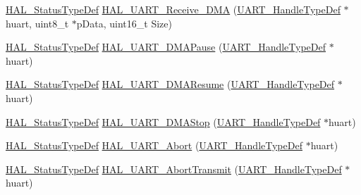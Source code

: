 \begin{DoxyCompactItemize}
\item 
\hyperlink{stm32f4xx__hal__def_8h_a63c0679d1cb8b8c684fbb0632743478f}{H\+A\+L\+\_\+\+Status\+Type\+Def} \hyperlink{group___u_a_r_t___exported___functions___group2_gad674cce054e58927720cd689620ffa08}{H\+A\+L\+\_\+\+U\+A\+R\+T\+\_\+\+Receive\+\_\+\+D\+MA} (\hyperlink{group___u_a_r_t___exported___types_ga7adf4f3e4c3ecde572be5925c915a967}{U\+A\+R\+T\+\_\+\+Handle\+Type\+Def} $\ast$huart, uint8\+\_\+t $\ast$p\+Data, uint16\+\_\+t Size)
\item 
\hyperlink{stm32f4xx__hal__def_8h_a63c0679d1cb8b8c684fbb0632743478f}{H\+A\+L\+\_\+\+Status\+Type\+Def} \hyperlink{group___u_a_r_t___exported___functions___group2_ga8a713fd976d8ef02b818ea6ff0d4e41a}{H\+A\+L\+\_\+\+U\+A\+R\+T\+\_\+\+D\+M\+A\+Pause} (\hyperlink{group___u_a_r_t___exported___types_ga7adf4f3e4c3ecde572be5925c915a967}{U\+A\+R\+T\+\_\+\+Handle\+Type\+Def} $\ast$huart)
\item 
\hyperlink{stm32f4xx__hal__def_8h_a63c0679d1cb8b8c684fbb0632743478f}{H\+A\+L\+\_\+\+Status\+Type\+Def} \hyperlink{group___u_a_r_t___exported___functions___group2_gaf2b3e6004d0200857781809baa16072d}{H\+A\+L\+\_\+\+U\+A\+R\+T\+\_\+\+D\+M\+A\+Resume} (\hyperlink{group___u_a_r_t___exported___types_ga7adf4f3e4c3ecde572be5925c915a967}{U\+A\+R\+T\+\_\+\+Handle\+Type\+Def} $\ast$huart)
\item 
\hyperlink{stm32f4xx__hal__def_8h_a63c0679d1cb8b8c684fbb0632743478f}{H\+A\+L\+\_\+\+Status\+Type\+Def} \hyperlink{group___u_a_r_t___exported___functions___group2_gab21aa06cfbaa1665b1062a803fcb4217}{H\+A\+L\+\_\+\+U\+A\+R\+T\+\_\+\+D\+M\+A\+Stop} (\hyperlink{group___u_a_r_t___exported___types_ga7adf4f3e4c3ecde572be5925c915a967}{U\+A\+R\+T\+\_\+\+Handle\+Type\+Def} $\ast$huart)
\item 
\hyperlink{stm32f4xx__hal__def_8h_a63c0679d1cb8b8c684fbb0632743478f}{H\+A\+L\+\_\+\+Status\+Type\+Def} \hyperlink{group___u_a_r_t___exported___functions___group2_ga2d7be1f59fc810f49dadc580307a4862}{H\+A\+L\+\_\+\+U\+A\+R\+T\+\_\+\+Abort} (\hyperlink{group___u_a_r_t___exported___types_ga7adf4f3e4c3ecde572be5925c915a967}{U\+A\+R\+T\+\_\+\+Handle\+Type\+Def} $\ast$huart)
\item 
\hyperlink{stm32f4xx__hal__def_8h_a63c0679d1cb8b8c684fbb0632743478f}{H\+A\+L\+\_\+\+Status\+Type\+Def} \hyperlink{group___u_a_r_t___exported___functions___group2_ga5a8858ffca45541416097961523d5fb2}{H\+A\+L\+\_\+\+U\+A\+R\+T\+\_\+\+Abort\+Transmit} (\hyperlink{group___u_a_r_t___exported___types_ga7adf4f3e4c3ecde572be5925c915a967}{U\+A\+R\+T\+\_\+\+Handle\+Type\+Def} $\ast$huart)

\end{DoxyCompactItemize}
